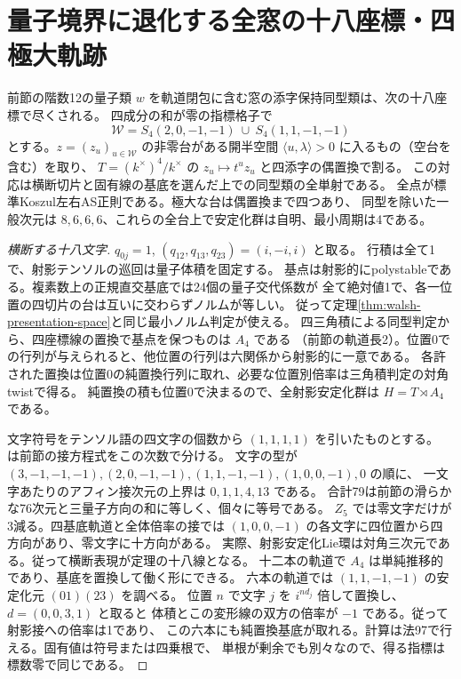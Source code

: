 \section{量子境界に退化する全窓の十八座標・四極大軌跡}
\label{sec:quantum-attraction-fiber}
\begin{theorem}\label{thm:quantum-attraction-fiber}
前節の階数12の量子類 $w$ を軌道閉包に含む窓の添字保持同型類は、次の十八座標で尽くされる。
四成分の和が零の指標格子で
\[
 \mathcal W=S_4(2,0,-1,-1)\ \cup\ S_4(1,1,-1,-1)
\]
とする。$z=(z_u)_{u\in\mathcal W}$ の非零台がある開半空間
$\langle u,\lambda\rangle>0$ に入るもの（空台を含む）を取り、
$T=(k^\times)^4/k^\times$ の $z_u\mapsto t^u z_u$ と四添字の偶置換で割る。
この対応は横断切片と固有線の基底を選んだ上での同型類の全単射である。
全点が標準Koszul左右AS正則である。極大な台は偶置換まで四つあり、
同型を除いた一般次元は $8,6,6,6$、これらの全台上で安定化群は自明、最小周期は4である。
\end{theorem}
\begin{proof}[横断する十八文字]
$q_{0j}=1$, $(q_{12},q_{13},q_{23})=(i,-i,i)$ と取る。
行積は全て1で、射影テンソルの巡回は量子体積を固定する。
基点は射影的にpolystableである。複素数上の正規直交基底では24個の量子交代係数が
全て絶対値1で、各一位置の四切片の台は互いに交わらずノルムが等しい。
従って定理\ref{thm:walsh-presentation-space}と同じ最小ノルム判定が使える。
四三角積による同型判定から、四座標線の置換で基点を保つものは $A_4$ である
（前節の軌道長2）。位置0での行列が与えられると、他位置の行列は六関係から射影的に一意である。
各許された置換は位置0の純置換行列に取れ、必要な位置別倍率は三角積判定の対角twistで得る。
純置換の積も位置0で決まるので、全射影安定化群は $H=T\rtimes A_4$ である。

文字符号をテンソル語の四文字の個数から $(1,1,1,1)$ を引いたものとする。
 は前節の接方程式をこの次数で分ける。
文字の型が $(3,-1,-1,-1),(2,0,-1,-1),(1,1,-1,-1),(1,0,0,-1),0$ の順に、
一文字あたりのアフィン接次元の上界は $0,1,1,4,13$ である。
合計79は前節の滑らかな76次元と三量子方向の和に等しく、個々に等号である。
$Z_5$ では零文字だけが3減る。四基底軌道と全体倍率の接では
$(1,0,0,-1)$ の各文字に四位置から四方向があり、零文字に十方向がある。
実際、射影安定化Lie環は対角三次元である。従って横断表現が定理の十八線となる。
十二本の軌道で $A_4$ は単純推移的であり、基底を置換して働く形にできる。
六本の軌道では $(1,1,-1,-1)$ の安定化元 $(01)(23)$ を調べる。
位置 $n$ で文字 $j$ を $i^{n d_j}$ 倍して置換し、$d=(0,0,3,1)$ と取ると
体積とこの変形線の双方の倍率が $-1$ である。従って射影接への倍率は1であり、
この六本にも純置換基底が取れる。計算は法97で行える。固有値は符号または四乗根で、
単根が剰余でも別々なので、得る指標は標数零で同じである。
\end{proof}

